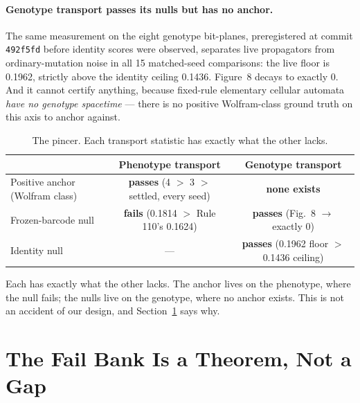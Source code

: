 \documentclass[man,12pt,floatsintext]{apa7}
\newif\ifdraftnotes
\newcommand{\dnote}[1]{\ifdraftnotes\textcolor{notecol}{\small\textbf{[NOTE:} #1\textbf{]}}\fi}
\begin{document}
\paragraph{Genotype transport passes its nulls but has no anchor.}
The same measurement on the eight genotype bit-planes, preregistered at
commit \texttt{492f5fd} before identity scores were observed, separates
live propagators from ordinary-mutation noise in all 15 matched-seed
comparisons: the live floor is 0.1962, strictly above the identity ceiling
0.1436. Figure~8 decays to exactly 0. And it cannot certify anything,
because fixed-rule elementary cellular automata \emph{have no genotype
spacetime} --- there is no positive Wolfram-class ground truth on this axis
to anchor against.

\begin{table}[htbp]
  \centering
  \caption{The pincer. Each transport statistic has exactly what the other
  lacks.}
  \label{tab:pincer}
  \begin{tabular}{lcc}
    \toprule
     & \textbf{Phenotype transport} & \textbf{Genotype transport} \\
    \midrule
    Positive anchor (Wolfram class) & \textbf{passes} (4 $>$ 3 $>$ settled, every seed) & \textbf{none exists} \\
    Frozen-barcode null            & \textbf{fails} (0.1814 $>$ Rule 110's 0.1624) & \textbf{passes} (Fig.~8 $\to$ exactly 0) \\
    Identity null                  & ---                                     & \textbf{passes} (0.1962 floor $>$ 0.1436 ceiling) \\
    \bottomrule
  \end{tabular}
\end{table}

Each has exactly what the other lacks. The anchor lives on the phenotype,
where the null fails; the nulls live on the genotype, where no anchor
exists. This is not an accident of our design, and Section~\ref{sec:theorem}
says why.

\section{The Fail Bank Is a Theorem, Not a Gap}
\label{sec:theorem}

\dnote{This section is the paper's thesis and currently its thinnest prose.
It is carrying the argument that turns a catalogue of failures into a
contribution, and it needs to be the best-written thing in the document.}
\end{document}
